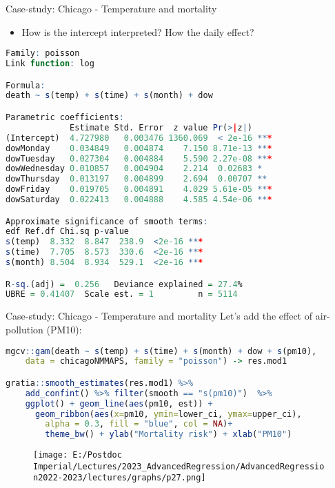 \documentclass{beamer}
\begin{document}
\begin{frame}[fragile]{Case-study: Chicago - Temperature and mortality}
	
	\begin{itemize}
		\item How is the intercept interpreted? How the daily effect?
	\end{itemize}
	\begin{lstlisting}[language=R, basicstyle=\tiny]
Family: poisson 
Link function: log 

Formula:
death ~ s(temp) + s(time) + s(month) + dow

Parametric coefficients:
             Estimate Std. Error  z value Pr(>|z|)    
(Intercept)  4.727980   0.003476 1360.069  < 2e-16 ***
dowMonday    0.034849   0.004874    7.150 8.71e-13 ***
dowTuesday   0.027304   0.004884    5.590 2.27e-08 ***
dowWednesday 0.010857   0.004904    2.214  0.02683 *  
dowThursday  0.013197   0.004899    2.694  0.00707 ** 
dowFriday    0.019705   0.004891    4.029 5.61e-05 ***
dowSaturday  0.022413   0.004888    4.585 4.54e-06 ***

Approximate significance of smooth terms:
edf Ref.df Chi.sq p-value    
s(temp)  8.332  8.847  238.9  <2e-16 ***
s(time)  7.705  8.573  330.6  <2e-16 ***
s(month) 8.504  8.934  529.1  <2e-16 ***

R-sq.(adj) =  0.256   Deviance explained = 27.4%
UBRE = 0.41407  Scale est. = 1         n = 5114
	\end{lstlisting}

\end{frame}

\begin{frame}[fragile]{Case-study: Chicago - Temperature and mortality}
	Let's add the effect of air-pollution (PM10):
	\begin{lstlisting}[language=R, basicstyle=\tiny]
mgcv::gam(death ~ s(temp) + s(time) + s(month) + dow + s(pm10), 
	data = chicagoNMMAPS, family = "poisson") -> res.mod1

gratia::smooth_estimates(res.mod1) %>%
	add_confint() %>% filter(smooth == "s(pm10)")  %>% 
	ggplot() + geom_line(aes(pm10, est)) + 
      geom_ribbon(aes(x=pm10, ymin=lower_ci, ymax=upper_ci), 
		alpha = 0.3, fill = "blue", col = NA)+
		theme_bw() + ylab("Mortality risk") + xlab("PM10")
	\end{lstlisting}

	\begin{figure}
	\texttt{[image: E:/Postdoc Imperial/Lectures/2023\_AdvancedRegression/AdvancedRegression2022-2023/lectures/graphs/p27.png]}
\end{figure}

\end{frame}
\end{document}
